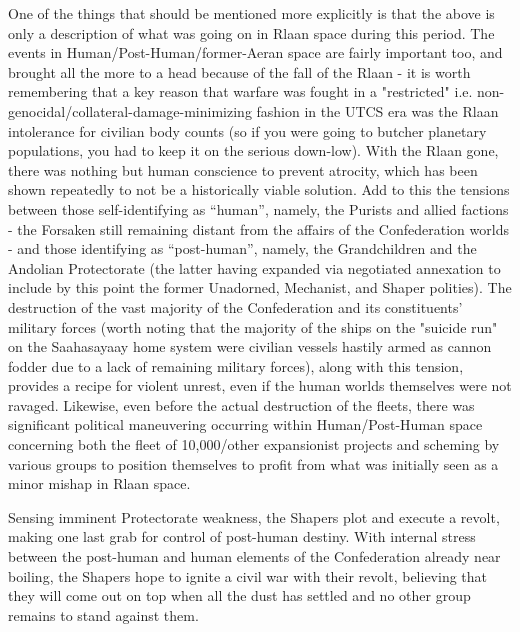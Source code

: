 One of the things that should be mentioned more explicitly is that the
above is only a description of what was going on in Rlaan space during
this period. The events in Human/Post-Human/former-Aeran space are
fairly important too, and brought all the more to a head because of
the fall of the Rlaan - it is worth remembering that a key reason that
warfare was fought in a "restricted"
i.e. non-genocidal/collateral-damage-minimizing fashion in the UTCS
era was the Rlaan intolerance for civilian body counts (so if you were
going to butcher planetary populations, you had to keep it on the
serious down-low). With the Rlaan gone, there was nothing but human
conscience to prevent atrocity, which has been shown repeatedly to not
be a historically viable solution. Add to this the tensions between
those self-identifying as ``human'', namely, the Purists and allied
factions - the Forsaken still remaining distant from the affairs of
the Confederation worlds - and those identifying as ``post-human'',
namely, the Grandchildren and the Andolian Protectorate (the latter
having expanded via negotiated annexation to include by this point the
former Unadorned, Mechanist, and Shaper polities). The destruction of
the vast majority of the Confederation and its constituents' military
forces (worth noting that the majority of the ships on the "suicide
run" on the Saahasayaay home system were civilian vessels hastily
armed as cannon fodder due to a lack of remaining military forces),
along with this tension, provides a recipe for violent unrest, even if
the human worlds themselves were not ravaged. Likewise, even before
the actual destruction of the fleets, there was significant political
maneuvering occurring within Human/Post-Human space concerning both
the fleet of 10,000/other expansionist projects and scheming by
various groups to position themselves to profit from what was
initially seen as a minor mishap in Rlaan space.

Sensing imminent Protectorate weakness, the Shapers plot and execute a
revolt, making one last grab for control of post-human destiny. With
internal stress between the post-human and human elements of the
Confederation already near boiling, the Shapers hope to ignite a civil
war with their revolt, believing that they will come out on top when
all the dust has settled and no other group remains to stand against
them.

